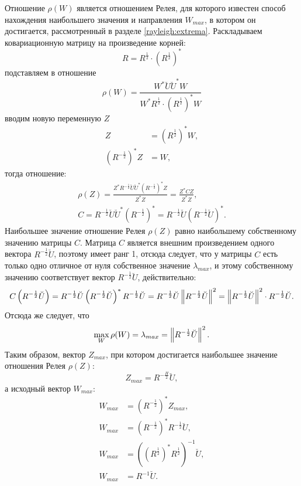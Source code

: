 Отношение $\rho(W)$ является отношением Релея, для которого известен способ нахождения наибольшего значения и направления $W_{max}$, в котором он достигается, рассмотренный
в разделе \ref{rayleigh:extrema}. Раскладываем ковариационную матрицу на произведение корней:
\[
    R = R^\frac{1}{2} \cdot \left( R^\frac{1}{2} \right)^*
\]
подставляем в отношение
\[
    \rho ( W )
    = \frac{W^* \breve{U} \breve{U}^* W}{W^* R^\frac{1}{2} \cdot \left( R^\frac{1}{2} \right)^* W}
\]
вводим новую переменную $Z$
\begin{align*}
    Z & = \left( R^\frac{1}{2} \right)^* W , \\
    \left( R^{-\frac{1}{2}} \right)^* Z & = W ,
\end{align*}
тогда отношение:
\begin{gather*}
    \rho(Z)
    = \frac{Z^* R^{-\frac{1}{2}} \breve{U} \breve{U}^* \left( R^{-\frac{1}{2}} \right)^* Z}{Z^* Z}
    = \frac{Z^* C Z}{Z^* Z}, \\
    C
    = R^{-\frac{1}{2}} \breve{U} \breve{U}^* \left( R^{-\frac{1}{2}} \right)^*
    = R^{-\frac{1}{2}} \breve{U} \left( R^{-\frac{1}{2}} \breve{U} \right)^*.
\end{gather*}
Наибольшее значение отношение Релея $\rho(Z)$ равно наибольшему собственному значению матрицы $C$. Матрица $C$ является внешним произведением одного вектора $R^{-\frac{1}{2}} \breve{U}$,
поэтому имеет ранг 1, отсюда следует, что у матрицы $C$ есть только одно отличное от нуля собственное значение $\lambda_{max}$, и этому собственному значению соответствует вектор
$R^{-\frac{1}{2}} \breve{U}$, действительно:
\[
    C \left ( R^{-\frac{1}{2}} \breve{U} \right )
    = R^{-\frac{1}{2}} \breve{U} \left ( R^{-\frac{1}{2}} \breve{U} \right )^* R^{-\frac{1}{2}} \breve{U}
    = R^{-\frac{1}{2}} \breve{U} \left \| R^{-\frac{1}{2}} \breve{U} \right \|^2
    = \left \| R^{-\frac{1}{2}} \breve{U} \right \|^2 \cdot R^{-\frac{1}{2}} \breve{U} .
\]
Отсюда же следует, что
\[
    \max \limits_W \rho(W) = \lambda_{max} = \left \| R^{-\frac{1}{2}} \breve{U} \right \|^2 .
\]
Таким образом, вектор $Z_{max}$, при котором достигается наибольшее значение отношения Релея $\rho(Z)$:
\[
    Z_{max} = R^{-\frac{H}{2}} \breve{U} ,
\]
а исходный вектор $W_{max}$:
\begin{align*}
    W_{max} & = \left( R^{-\frac{1}{2}} \right)^* Z_{max} , \\
    W_{max} & = \left( R^{-\frac{1}{2}} \right)^* R^{-\frac{1}{2}} \breve{U} , \\
    W_{max} & = \left( \left ( R^{\frac{1}{2}} \right)^* R^{\frac{1}{2}} \right )^{-1} \breve{U} , \\
    W_{max} & = R^{-1} \breve{U} .
\end{align*}

